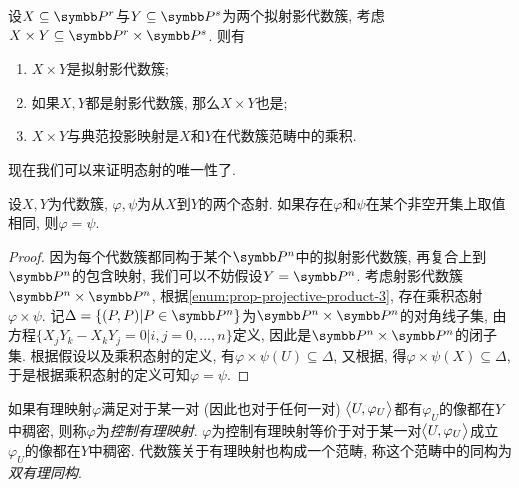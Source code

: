 \begin{proposition}\label{prop:projectiveproduct}
  设$X\subseteq\PP^r$与$Y\subseteq\PP^s$为两个拟射影代数簇, 考虑$X\times Y\subseteq \PP^r\times\PP^s$. 则有
  \begin{enumerate}
    \item $X\times Y$是拟射影代数簇;
    \item 如果$X, Y$都是射影代数簇, 那么$X\times Y$也是;
    \item\label{enum:prop-projective-product-3} $X\times Y$与典范投影映射是$X$和$Y$在代数簇范畴中的乘积.
  \end{enumerate}
\end{proposition}

现在我们可以来证明态射的唯一性了.

\begin{proposition}
  设$X, Y$为代数簇, $\varphi, \psi$为从$X$到$Y$的两个态射. 如果存在$\varphi$和$\psi$在某个非空开集上取值相同, 则$\varphi=\psi$.
\end{proposition}

\begin{proof}
  因为每个代数簇都同构于某个$\PP^n$中的拟射影代数簇, 再复合上到$\PP^n$的包含映射, 我们可以不妨假设$Y=\PP^n$. 考虑射影代数簇$\PP^n\times \PP^n$, 根据\ref{enum:prop-projective-product-3}, 存在乘积态射$\varphi\times \psi$. 记$\Delta=\{(P, P)\vert P\in \PP^n\}$为$\PP^n\times \PP^n$的对角线子集, 由方程$\{X_jY_k-X_kY_j=0\vert i, j=0, \dotsc, n\}$定义, 因此是$\PP^n\times \PP^n$的闭子集. 根据假设以及乘积态射的定义, 有$\varphi\times \psi(U)\subseteq \Delta$, 又根据, 得$\varphi\times \psi(X)\subseteq\Delta$, 于是根据乘积态射的定义可知$\varphi=\psi$.
\end{proof}

如果有理映射$\varphi$满足对于某一对 (因此也对于任何一对) $\lrbig<>{U, \varphi_U}$都有$\varphi_U$的像都在$Y$中稠密, 则称$\varphi$为\emph{控制有理映射}. $\varphi$为控制有理映射等价于对于某一对$\lrbig<>{U, \varphi_U}$成立$\varphi_U$的像都在$Y$中稠密. 代数簇关于有理映射也构成一个范畴, 称这个范畴中的同构为\emph{双有理同构}.
